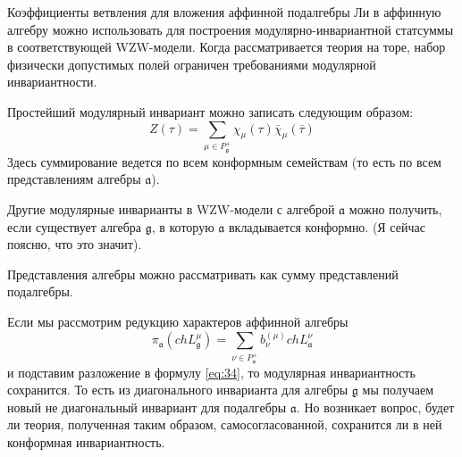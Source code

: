 \documentclass[a4paper,12pt]{article}
\theoremstyle{definition} \newtheorem{Def}{Definition}
\begin{document}
Коэффициенты ветвления для вложения аффинной подалгебры Ли в аффинную алгебру можно использовать для
построения модулярно-инвариантной статсуммы в соответствующей WZW-модели. Когда рассматривается
теория на торе,  набор физически допустимых полей ограничен требованиями модулярной инвариантности.

Простейший модулярный инвариант можно записать следующим образом:
\begin{equation}
  \label{eq:34}
   Z(\tau)=\sum_{ \mu\in P^{+}_{\mathfrak{g}}} \chi_{\mu}(\tau)\bar \chi_{\mu}(\bar \tau)
\end{equation}
Здесь суммирование ведется по всем конформным семействам (то есть по всем представлениям алгебры
$\mathfrak{a}$).

Другие модулярные инварианты в WZW-модели с алгеброй $\mathfrak{a}$ можно получить, если существует
алгебра $\mathfrak{g}$, в которую $\mathfrak{a}$ вкладывается конформно. (Я сейчас поясню, что это
значит). 

Представления алгебры можно рассматривать как сумму представлений подалгебры. 

Если мы рассмотрим редукцию характеров аффинной алгебры
\begin{equation}
  \label{eq:8}
   \pi_{\mathfrak{a}}(ch L^{\mu}_{\mathfrak{g}})=
  \sum_{\nu\in P^{+}_{\mathfrak{a}}}b^{(\mu)}_{\nu} ch L^{\nu}_{\mathfrak{a}}
\end{equation}
и подставим разложение в формулу \eqref{eq:34}, то модулярная инвариантность сохранится. То есть из
диагонального инварианта для алгебры $\mathfrak{g}$ мы получаем новый не диагональный инвариант для
подалгебры $\mathfrak{a}$. Но возникает вопрос, будет ли теория, полученная таким образом, самосогласованной, сохранится ли в
ней конформная инвариантность.
\end{document}
